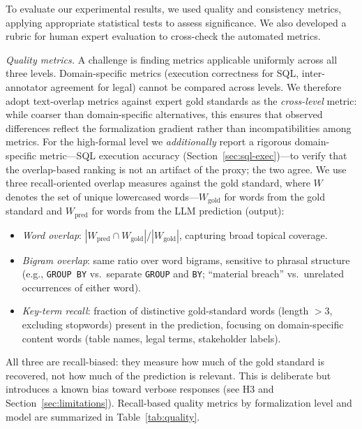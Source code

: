 \documentclass[runningheads]{llncs}
\begin{document}
To evaluate our experimental results, we used quality and consistency metrics, applying appropriate statistical tests to assess significance.  We also developed a rubric for human expert evaluation to cross-check the automated metrics.

\vspace{5pt}
\noindent
\textit{Quality metrics.}
A challenge is finding metrics applicable uniformly across all three levels. Domain-specific metrics (execution correctness for SQL, inter-anno\-ta\-tor agreement for legal) cannot be compared across levels. We therefore adopt text-overlap metrics against expert gold standards as the \emph{cross-level} metric: while coarser than domain-specific alternatives, this ensures that observed differences reflect the formalization gradient rather than incompatibilities among metrics. For the high-formal level we \emph{additionally} report a rigorous domain-specific metric---SQL execution accuracy (Section~\ref{sec:sql-exec})---to verify that the overlap-based ranking is not an artifact of the proxy; the two agree. We use three recall-oriented overlap measures against the gold standard, where $W$ denotes the set of unique lowercased words---$W_{\text{gold}}$ for words from the gold standard and $W_{\text{pred}}$ for words from the LLM prediction (output):
\begin{itemize}[itemsep=4pt]
  \item \textit{Word overlap}: $|W_{\text{pred}} \cap W_{\text{gold}}| / |W_{\text{gold}}|$, capturing broad topical coverage.
  \item \textit{Bigram overlap}: same ratio over word bigrams, sensitive to phrasal structure (e.g., \texttt{GROUP BY} vs.\ separate \texttt{GROUP} and \texttt{BY}; ``material breach'' vs.\ unrelated occurrences of either word).
  \item \textit{Key-term recall}: fraction of distinctive gold-standard words (length $>3$, excluding stopwords) present in the prediction, focusing on domain-specific content words (table names, legal terms, stakeholder labels).
\end{itemize}
All three are recall-biased: they measure how much of the gold standard is recovered, not how much of the prediction is relevant. This is deliberate but introduces a known bias toward verbose responses (see H3 and Section~\ref{sec:limitations}). Recall-based quality metrics by formalization level and model are summarized in Table~\ref{tab:quality}.
\end{document}
